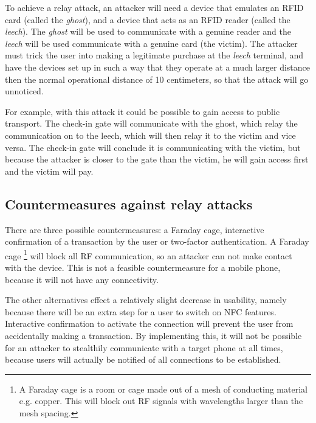 To achieve a relay attack, an attacker will need a device that emulates an RFID card (called the \textit{ghost}), and a device that acts as an RFID reader (called the \textit{leech}).
The \textit{ghost} will be used to communicate with a genuine reader and the \textit{leech} will be used communicate with a genuine card (the victim).
The attacker must trick the user into making a legitimate purchase at the \textit{leech} terminal, and have the devices set up in such a way that they operate at a much larger distance then the normal operational distance of 10 centimeters, so that the attack will go unnoticed. \cite{1128470}

For example, with this attack it could be possible to gain access to public transport.
The check-in gate will communicate with the ghost, which relay the communication on to the leech, which will then relay it to the victim and vice versa.
The check-in gate will conclude it is communicating with the victim, but because the attacker is closer to the gate than the victim, he will gain access first and the victim will pay.

\subsection{Countermeasures against relay attacks}
There are three possible countermeasures: a Faraday cage, interactive confirmation of a transaction by the user or two-factor authentication.
A Faraday cage \footnote{A Faraday cage is a room or cage made out of a mesh of conducting material e.g. copper. This will block out RF signals with wavelengths larger than the mesh spacing.}  will block all RF communication, so an attacker can not make contact with the device.
This is not a feasible countermeasure for a mobile phone, because it will not have any connectivity.

The other alternatives effect a relatively slight decrease in usability, namely because there will be an extra step for a user to switch on NFC features.
Interactive confirmation to activate the connection will prevent the user from accidentally making a transaction.
By implementing this, it will not be possible for an attacker to stealthily communicate with a target phone at all times, because users will actually be notified  of all connections to be established.

